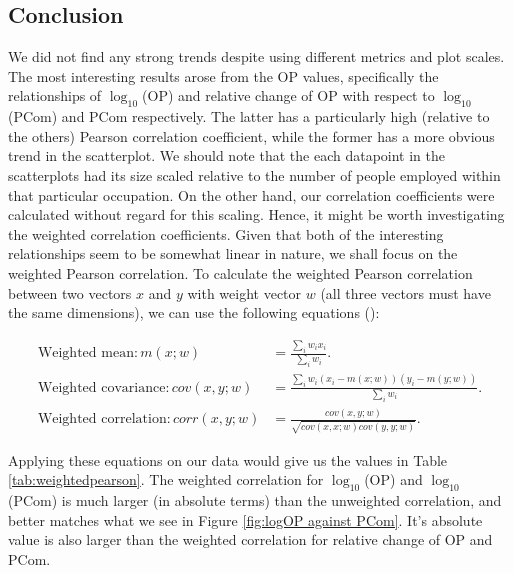 \documentclass[11pt]{article}
\begin{document}
\subsection{Conclusion}
We did not find any strong trends despite using different metrics and plot scales. The most interesting results arose from the OP values, specifically the relationships of $\log_{10}$(OP) and relative change of OP with respect to $\log_{10}$(PCom) and PCom respectively. The latter has a particularly high (relative to the others) Pearson correlation coefficient, while the former has a more obvious trend in the scatterplot. We should note that the each datapoint in the scatterplots had its size scaled relative to the number of people employed within that particular occupation. On the other hand, our correlation coefficients were calculated without regard for this scaling. Hence, it might be worth investigating the weighted correlation coefficients. Given that both of the interesting relationships seem to be somewhat linear in nature, we shall focus on the weighted Pearson correlation. To calculate the weighted Pearson correlation between two vectors $x$ and $y$ with weight vector $w$ (all three vectors must have the same dimensions), we can use the following equations (\cite{bailey2018weighted}):

\begin{equation} \label{eq1}
	\begin{split}
		\text{Weighted mean}: m(x; w) & = \frac{\sum_{i}w_{i}x_{i}}{\sum_{i}w_{i}}. \\
		\text{Weighted covariance}: cov(x, y; w) & = \frac{\sum_{i}w_{i}(x_{i}-m(x; w))(y_{i}-m(y; w))}{\sum_{i}w_{i}}. \\
		\text{Weighted correlation}: corr(x, y; w) & = \frac{cov(x, y; w)}{\sqrt{cov(x, x; w)cov(y, y; w)}}.
	\end{split}
	\end{equation}

Applying these equations on our data would give us the values in Table \ref{tab:weightedpearson}. The weighted correlation for $\log_{10}$(OP) and $\log_{10}$(PCom) is much larger (in absolute terms) than the unweighted correlation, and better matches what we see in Figure \ref{fig:logOP against PCom}. It's absolute value is also larger than the weighted correlation for relative change of OP and PCom.
\end{document}
